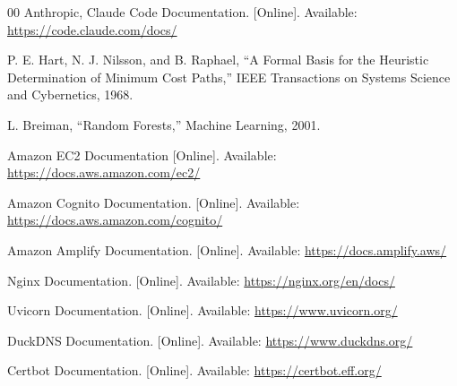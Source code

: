 \documentclass[conference]{IEEEtran}
\begin{document}
\begin{thebibliography}{00}
 Anthropic, Claude Code Documentation. [Online]. Available: \url{https://code.claude.com/docs/}

 P. E. Hart, N. J. Nilsson, and B. Raphael, ``A Formal Basis for the Heuristic Determination of Minimum Cost Paths,'' IEEE Transactions on Systems Science and Cybernetics, 1968.

 L. Breiman, ``Random Forests,'' Machine Learning, 2001.

 Amazon EC2 Documentation [Online]. Available: \url{https://docs.aws.amazon.com/ec2/}

 Amazon Cognito Documentation. [Online]. Available: \url{https://docs.aws.amazon.com/cognito/}

 Amazon Amplify Documentation. [Online]. Available: \url{https://docs.amplify.aws/}

 Nginx Documentation. [Online]. Available: \url{https://nginx.org/en/docs/}

 Uvicorn Documentation. [Online]. Available: \url{https://www.uvicorn.org/}

 DuckDNS Documentation. [Online]. Available: \url{https://www.duckdns.org/}

 Certbot Documentation. [Online]. Available: \url{https://certbot.eff.org/}
\end{thebibliography}
\end{document}
